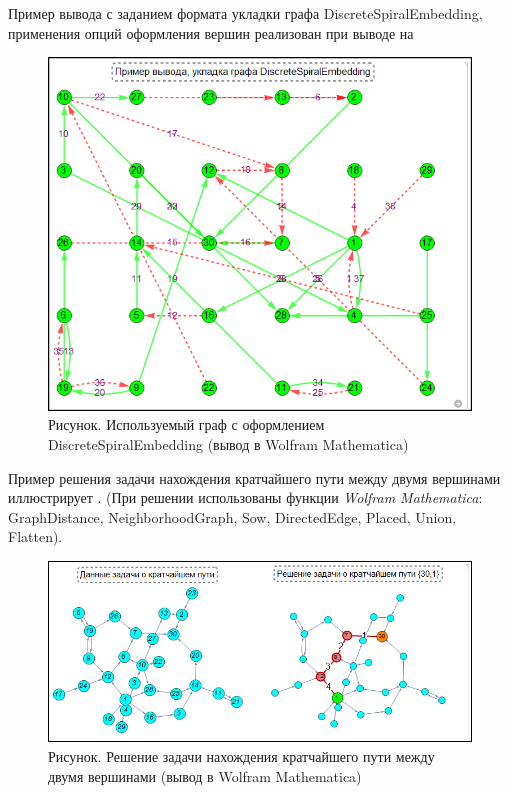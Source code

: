 Пример вывода с заданием формата укладки графа DiscreteSpiralEmbedding, применения опций оформления вершин реализован при выводе на \textit{} 

\begin{figure}[H]
	\includegraphics[scale=0.87]{images/part7/chapter_integration/integr_alg34.png}
	\caption{Рисунок. Используемый граф с оформлением DiscreteSpiralEmbedding (вывод в Wolfram Mathematica)}
	\label{fig:integr_alg34}
\end{figure}

Пример решения задачи нахождения кратчайшего пути между двумя вершинами иллюстрирует \textit{}. (При решении использованы функции \textit{Wolfram Mathematica}: GraphDistance, NeighborhoodGraph, Sow, DirectedEdge, Placed, Union, Flatten).

\begin{figure}[H]
	\includegraphics[scale=0.55]{images/part7/chapter_integration/integr_alg35.png}
	\caption{Рисунок. Решение задачи нахождения кратчайшего пути между двумя вершинами (вывод в Wolfram Mathematica)}
	\label{fig:integr_alg35}
\end{figure}

